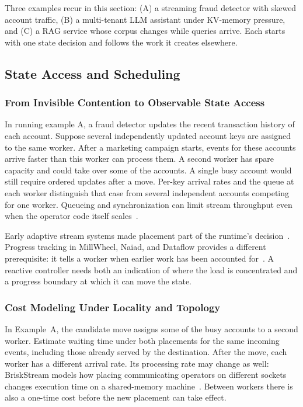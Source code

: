 \documentclass[manuscript]{acmart}
\begin{document}
Three examples recur in this section: (A) a streaming fraud detector with skewed account traffic, (B) a multi-tenant LLM assistant under KV-memory pressure, and (C) a RAG service whose corpus changes while queries arrive. Each starts with one state decision and follows the work it creates elsewhere.

\subsection{State Access and Scheduling}

\subsubsection{From Invisible Contention to Observable State Access}

In running example A, a fraud detector updates the recent transaction history of each account. Suppose several independently updated account keys are assigned to the same worker. After a marketing campaign starts, events for these accounts arrive faster than this worker can process them. A second worker has spare capacity and could take over some of the accounts. A single busy account would still require ordered updates after a move. Per-key arrival rates and the queue at each worker distinguish that case from several independent accounts competing for one worker. Queueing and synchronization can limit stream throughput even when the operator code itself scales~\cite{zhang2017revisiting,zhang2017mqo}.

Early adaptive stream systems made placement part of the runtime's decision~\cite{abadi2003aurora,abadi2005borealis}. Progress tracking in MillWheel, Naiad, and Dataflow provides a different prerequisite: it tells a worker when earlier work has been accounted for~\cite{akidau2013millwheel,murray2013naiad,akidau2015dataflow}. A reactive controller needs both an indication of where the load is concentrated and a progress boundary at which it can move the state.

\subsubsection{Cost Modeling Under Locality and Topology}

In Example~A, the candidate move assigns some of the busy accounts to a second worker. Estimate waiting time under both placements for the same incoming events, including those already served by the destination. After the move, each worker has a different arrival rate. Its processing rate may change as well: BriskStream models how placing communicating operators on different sockets changes execution time on a shared-memory machine~\cite{zhang2019briskstream}. Between workers there is also a one-time cost before the new placement can take effect.
\end{document}
